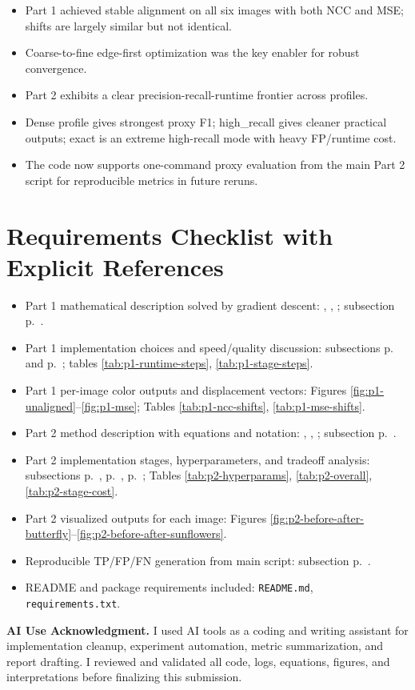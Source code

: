 {\begin{itemize}
\item Part 1 achieved stable alignment on all six images with both NCC and MSE; shifts are largely similar but not identical.
\item Coarse-to-fine edge-first optimization was the key enabler for robust convergence.
\item Part 2 exhibits a clear precision-recall-runtime frontier across profiles.
\item Dense profile gives strongest proxy F1; high\_recall gives cleaner practical outputs; exact is an extreme high-recall mode with heavy FP/runtime cost.
\item The code now supports one-command proxy evaluation from the main Part 2 script for reproducible metrics in future reruns.
\end{itemize}

\section*{Requirements Checklist with Explicit References}
\label{sec:checklist}
\begin{itemize}
\item Part 1 mathematical description solved by gradient descent: , , ; subsection p.~\pageref{sec:p1-opt}.
\item Part 1 implementation choices and speed/quality discussion: subsections p.~\pageref{sec:p1-overview} and p.~\pageref{sec:p1-impl}; tables \ref{tab:p1-runtime-steps}, \ref{tab:p1-stage-steps}.
\item Part 1 per-image color outputs and displacement vectors: Figures \ref{fig:p1-unaligned}--\ref{fig:p1-mse}; Tables \ref{tab:p1-ncc-shifts}, \ref{tab:p1-mse-shifts}.
\item Part 2 method description with equations and notation: , , ; subsection p.~\pageref{sec:p2-method}.
\item Part 2 implementation stages, hyperparameters, and tradeoff analysis: subsections p.~\pageref{sec:p2-overview}, p.~\pageref{sec:p2-hyperparams}, p.~\pageref{sec:p2-metrics}; Tables \ref{tab:p2-hyperparams}, \ref{tab:p2-overall}, \ref{tab:p2-stage-cost}.
\item Part 2 visualized outputs for each image: Figures \ref{fig:p2-before-after-butterfly}--\ref{fig:p2-before-after-sunflowers}.
\item Reproducible TP/FP/FN generation from main script: subsection p.~\pageref{sec:p2-repro}.
\item README and package requirements included: \texttt{README.md}, \texttt{requirements.txt}.
\end{itemize}

\begin{mdframed}[linewidth=1pt]
\textbf{AI Use Acknowledgment.}
I used AI tools as a coding and writing assistant for implementation cleanup, experiment automation, metric summarization, and report drafting. I reviewed and validated all code, logs, equations, figures, and interpretations before finalizing this submission.
\end{mdframed}

}
